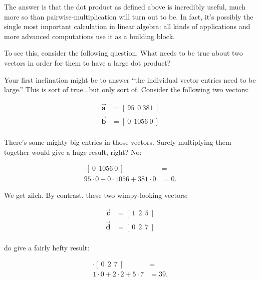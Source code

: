 The answer is that the dot product as defined above is incredibly useful, much
more so than pairwise-multiplication will turn out to be. In fact, it's
possibly the single most important calculation in linear algebra: all kinds of
applications and more advanced computations use it as a building block.

To see this, consider the following question. What needs to be true about two
vectors in order for them to have a large dot product?

Your first inclination might be to answer ``the individual vector entries need
to be large.'' This is sort of true...but only sort of. Consider the following
two vectors:

\vspace{-.15in}
\begin{align*}
\overrightarrow{\textbf{a}} &= [\ 95\ \ 0\ 381\  ] \\
\overrightarrow{\textbf{b}} &= [\ 0\ \ 1056\ 0\  ] \\
\end{align*}
\vspace{-.15in}

There's some mighty big entries in those vectors. Surely multiplying them
together would give a huge result, right? No:

\vspace{-.15in}
\begin{align*}
[\ 95\ \ 0\ 381\ ] \cdot [\ 0\ \ 1056\ 0\ ] &= \\
95 \cdot 0 + 0 \cdot 1056 + 381 \cdot 0 &= 0.
\end{align*}
\vspace{-.15in}

We get zilch. By contrast, these two wimpy-looking vectors:

\vspace{-.15in}
\begin{align*}
\overrightarrow{\textbf{c}} &= [\ 1\ \ 2\ \ 5\ ] \\
\overrightarrow{\textbf{d}} &= [\ 0\ \ 2\ \ 7\ ] \\
\end{align*}
\vspace{-.15in}

do give a fairly hefty result:

\vspace{-.15in}
\begin{align*}
[\ 1\ \ 2\ \ 5\ ] \cdot [\ 0\ \ 2\ \ 7\ ] &= \\
1 \cdot 0 + 2 \cdot 2 + 5 \cdot 7 &= 39.
\end{align*}
\vspace{-.15in}

